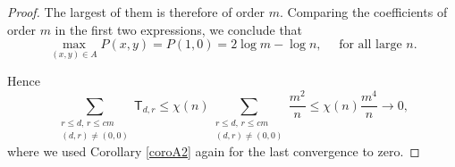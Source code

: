 \documentclass[reqno]{amsart}
\def\blue{\color{blue}}
\def\red{\color{red}}
\theoremstyle{theorem}
\theoremstyle{definition}
\theoremstyle{remark}
\newcommand{\1}{{\text{\Large $\mathfrak 1$}}}	%
\numberwithin{equation}{section}
\newcommand{\tkside}[1]{\marginpar{\color{Fuchsia}\footnotesize \tt\bfseries #1}}
\def\TTT{\mathsf T}
\begin{document}
\begin{proof}
The largest of them is therefore of order $m$. 
Comparing the coefficients of order $m$ in the first two expressions, we
conclude that
\[
\max_{(x,y)\in A} P(x,y) = P(1, 0) = 2 \log m - \log n, \quad \text{ for all large $n$.}
\]

Hence
\[
\sum_{\substack{r\le d,\,r\le cm \\ (d,r)\neq (0,0) }} \TTT_{d,r} 
\le \chi(n) \sum_{\substack{r\le d,\,r\le cm \\ (d,r)\neq (0,0) }} \frac{m^2}{n}
\le \chi(n) \frac{m^4}{n} \to 0,
\]
where we used Corollary \ref{coroA2} again for the last convergence to zero.



\end{proof}
\end{document}
